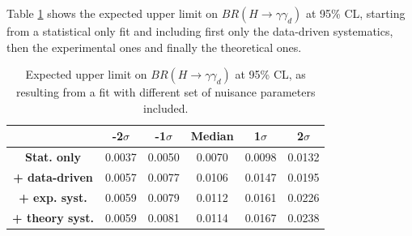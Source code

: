 Table \ref{tab:limit_syst_breakdown} shows the expected upper limit on $BR(H\rightarrow \gamma \gamma_d)$ at 95\% CL, starting from a statistical only fit and including first only the data-driven systematics, then the experimental ones and finally the theoretical ones. 
\begin{table}[ht!]
    \centering
    \begin{tabular}{c|ccccc}
    \hline
       & \textbf{-2$\sigma$} & \textbf{-1$\sigma$} & \textbf{Median} & \textbf{1$\sigma$} & \textbf{2$\sigma$} \\
       \hline
     \textbf{Stat. only} & 0.0037 &  0.0050 &  0.0070 & 0.0098 & 0.0132 \\
     \textbf{+ data-driven} & 0.0057 &  0.0077 &  0.0106 & 0.0147 & 0.0195 \\
     \textbf{+ exp. syst. } & 0.0059 &  0.0079 &  0.0112 & 0.0161 & 0.0226 \\
     \textbf{+ theory syst.} & 0.0059 &  0.0081 &  0.0114 & 0.0167 & 0.0238 \\
     \hline
    \end{tabular}
    \caption{Expected upper limit on $BR(H\rightarrow \gamma \gamma_d)$ at 95\% CL, as resulting from a fit with different set of nuisance parameters included.}
    \label{tab:limit_syst_breakdown}
\end{table}



\clearpage